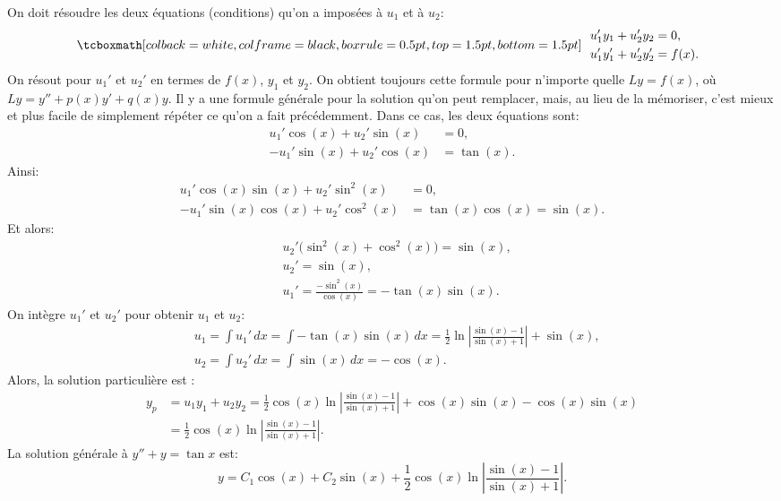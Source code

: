 On doit résoudre les deux équations (conditions) qu'on a imposées à  $u_1$ et à $u_2$:
\begin{equation*}
\mybxbg{~~ \begin{aligned}
				& u_1' y_1 + u_2' y_2 = 0 ,\\
				& u_1' y_1' + u_2' y_2' = f(x) .
		\end{aligned}~~}
\end{equation*}
On résout pour $u_1'$ et $u_2'$ en termes de $f(x)$, $y_1$ et $y_2$.
On obtient toujours cette formule pour n'importe quelle $Ly = f(x)$, où $Ly = y''+p(x)y'+q(x)y$.  
Il y a une formule générale pour la solution qu'on peut remplacer, mais, au lieu de la mémoriser, c'est mieux et plus facile de simplement répéter ce qu'on a fait précédemment. Dans ce cas, les deux équations sont:  
\begin{align*}
	 u_1' \cos (x) + u_2' \sin (x) &= 0 ,\\
	-u_1' \sin (x) + u_2' \cos (x) &= \tan (x) .
\end{align*}
Ainsi: 
\begin{align*}
	 u_1' \cos (x) \sin (x) + u_2' \sin^2 (x) & = 0 ,\\
	-u_1' \sin (x) \cos (x) + u_2' \cos^2 (x) & = \tan (x) \cos (x) = \sin (x) .
\end{align*}
Et alors: 
\begin{align*}
	& u_2' \bigl(\sin^2 (x) + \cos^2 (x)\bigr) = \sin (x) , \\
	& u_2' = \sin (x) , \\
	& u_1' = \frac{- \sin^2 (x)}{\cos (x)} = - \tan (x) \sin (x) .
\end{align*}
On intègre $u_1'$ et $u_2'$ pour obtenir $u_1$ et $u_2$: 
\begin{align*}
	& u_1 = \int u_1'\,dx 	= \int - \tan (x) \sin (x)\,dx 
		= \frac{1}{2} \ln \left\lvert \frac{\sin (x)-1}{\sin (x) + 1} \right\rvert 	+ \sin (x) , \\
	& u_2 = \int u_2'\,dx 	= \int \sin (x)\,dx = -\cos (x) .
\end{align*}
Alors, la solution particulière est : 
\begin{align*}
	y_p &= u_1 y_1 + u_2 y_2 =
	\frac12 \cos (x) \ln \left\lvert \frac{\sin (x)-1}{\sin (x) + 1}	\right\rvert
	+ \cos (x) \sin (x) -\cos (x) \sin (x)	\\ 
	&= 	\frac12 \cos (x) \ln \left\lvert \frac{\sin (x)-1}{\sin (x) + 1} \right\rvert .
\end{align*}
La solution générale à  $y'' + y = \tan x$ est: 
\begin{equation*}
	y = C_1 \cos (x) + C_2 \sin (x) + \frac{1}{2} \cos (x) \ln \left\lvert \frac{\sin (x)-1}{\sin (x) + 1}
\right\rvert .
\end{equation*}

